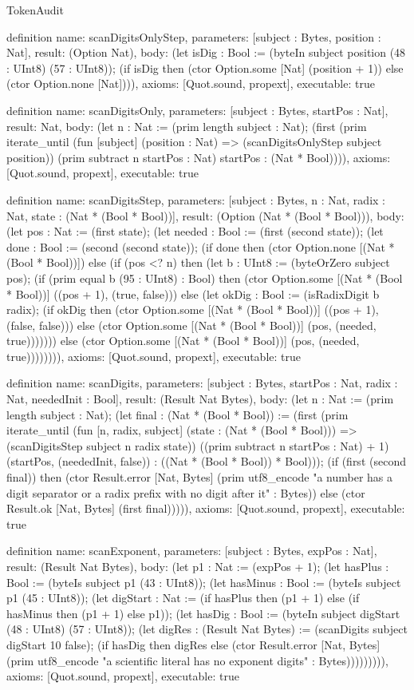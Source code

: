 \begin{lexlean}{TokenAudit}
\begin{semanticmodule}
definition{
  name: scanDigitsOnlyStep,
  parameters: [subject : Bytes, position : Nat],
  result: (Option Nat),
  body: (let isDig : Bool := (byteIn subject position (48 : UInt8) (57 : UInt8)); (if isDig then (ctor Option.some [Nat] (position + 1)) else (ctor Option.none [Nat]))),
  axioms: [Quot.sound, propext],
  executable: true
}

definition{
  name: scanDigitsOnly,
  parameters: [subject : Bytes, startPos : Nat],
  result: Nat,
  body: (let n : Nat := (prim length subject : Nat); (first (prim iterate_until (fun [subject] (position : Nat) => (scanDigitsOnlyStep subject position)) (prim subtract n startPos : Nat) startPos : (Nat * Bool)))),
  axioms: [Quot.sound, propext],
  executable: true
}

definition{
  name: scanDigitsStep,
  parameters: [subject : Bytes, n : Nat, radix : Nat, state : (Nat * (Bool * Bool))],
  result: (Option (Nat * (Bool * Bool))),
  body: (let pos : Nat := (first state); (let needed : Bool := (first (second state)); (let done : Bool := (second (second state)); (if done then (ctor Option.none [(Nat * (Bool * Bool))]) else (if (pos <? n) then (let b : UInt8 := (byteOrZero subject pos); (if (prim equal b (95 : UInt8) : Bool) then (ctor Option.some [(Nat * (Bool * Bool))] ((pos + 1), (true, false))) else (let okDig : Bool := (isRadixDigit b radix); (if okDig then (ctor Option.some [(Nat * (Bool * Bool))] ((pos + 1), (false, false))) else (ctor Option.some [(Nat * (Bool * Bool))] (pos, (needed, true))))))) else (ctor Option.some [(Nat * (Bool * Bool))] (pos, (needed, true)))))))),
  axioms: [Quot.sound, propext],
  executable: true
}

definition{
  name: scanDigits,
  parameters: [subject : Bytes, startPos : Nat, radix : Nat, neededInit : Bool],
  result: (Result Nat Bytes),
  body: (let n : Nat := (prim length subject : Nat); (let final : (Nat * (Bool * Bool)) := (first (prim iterate_until (fun [n, radix, subject] (state : (Nat * (Bool * Bool))) => (scanDigitsStep subject n radix state)) ((prim subtract n startPos : Nat) + 1) (startPos, (neededInit, false)) : ((Nat * (Bool * Bool)) * Bool))); (if (first (second final)) then (ctor Result.error [Nat, Bytes] (prim utf8_encode "a number has a digit separator or a radix prefix with no digit after it" : Bytes)) else (ctor Result.ok [Nat, Bytes] (first final))))),
  axioms: [Quot.sound, propext],
  executable: true
}

definition{
  name: scanExponent,
  parameters: [subject : Bytes, expPos : Nat],
  result: (Result Nat Bytes),
  body: (let p1 : Nat := (expPos + 1); (let hasPlus : Bool := (byteIs subject p1 (43 : UInt8)); (let hasMinus : Bool := (byteIs subject p1 (45 : UInt8)); (let digStart : Nat := (if hasPlus then (p1 + 1) else (if hasMinus then (p1 + 1) else p1)); (let hasDig : Bool := (byteIn subject digStart (48 : UInt8) (57 : UInt8)); (let digRes : (Result Nat Bytes) := (scanDigits subject digStart 10 false); (if hasDig then digRes else (ctor Result.error [Nat, Bytes] (prim utf8_encode "a scientific literal has no exponent digits" : Bytes))))))))),
  axioms: [Quot.sound, propext],
  executable: true
}


\end{semanticmodule}
\end{lexlean}
